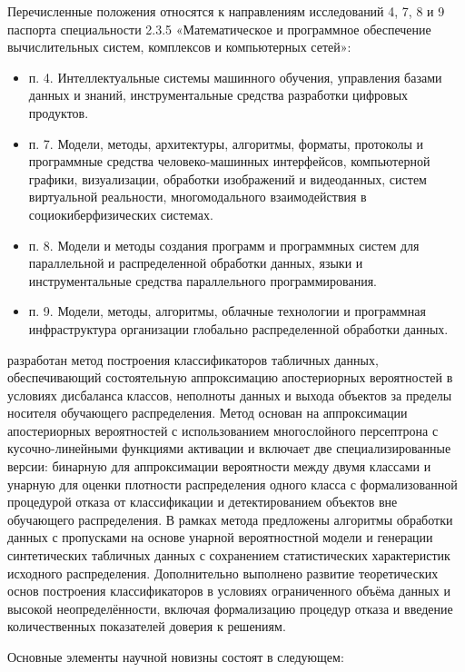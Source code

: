 Перечисленные положения относятся к направлениям исследований 4, 7, 8 и 9 паспорта специальности 2.3.5 «Математическое и программное обеспечение вычислительных систем, комплексов и компьютерных сетей»:
\begin{itemize}
    \item п. 4. Интеллектуальные системы машинного обучения, управления базами данных и знаний, инструментальные средства разработки цифровых продуктов.
    \item п. 7. Модели, методы, архитектуры, алгоритмы, форматы, протоколы и программные средства человеко-машинных интерфейсов, компьютерной графики, визуализации, обработки изображений и видеоданных, систем виртуальной реальности, многомодального взаимодействия в социокиберфизических системах.
    \item п. 8. Модели и методы создания программ и программных систем для параллельной и распределенной обработки данных, языки и инструментальные средства параллельного программирования.
    \item п. 9. Модели, методы, алгоритмы, облачные технологии и программная инфраструктура организации глобально распределенной обработки данных.
\end{itemize}

{\novelty} разработан метод построения классификаторов табличных данных, обеспечивающий состоятельную аппроксимацию апостериорных вероятностей в условиях дисбаланса классов, неполноты данных и выхода объектов за пределы носителя обучающего распределения. Метод основан на аппроксимации апостериорных вероятностей с использованием многослойного персептрона с кусочно-линейными функциями активации и включает две специализированные версии: бинарную для аппроксимации вероятности между двумя классами и унарную для оценки плотности распределения одного класса с формализованной процедурой отказа от классификации и детектированием объектов вне обучающего распределения. В рамках метода предложены алгоритмы обработки данных с пропусками на основе унарной вероятностной модели и генерации синтетических табличных данных с сохранением статистических характеристик исходного распределения. Дополнительно выполнено развитие теоретических основ построения классификаторов в условиях ограниченного объёма данных и высокой неопределённости, включая формализацию процедур отказа и введение количественных показателей доверия к решениям.

Основные элементы научной новизны состоят в следующем:

